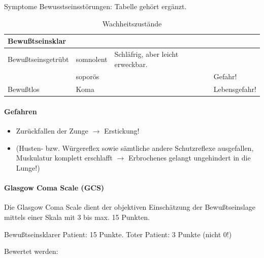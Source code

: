 Symptome Bewusstseinsst\"orungen: Tabelle geh\"ort erg\"anzt.%
%



\begin{table}[H]\begin{center}
\begin{tabulary}{\linewidth}{LLLL}
\toprule
Bewu{\ss}tseinsklar
 &
 &
 &
\\\midrule
Bewu{\ss}tseinsgetr\"ubt
&
somnolent
 &
Schl\"afrig, aber leicht erweckbar.
 &
\\
 &
sopor\"os
 &
 &
Gefahr!
\\\midrule
Bewu{\ss}tlos
 &
Koma
 &
 &
Lebensgefahr!
\\\bottomrule
\end{tabulary}
\caption{Wachheitszustände}
\end{center}\end{table}


\paragraph{Gefahren}

\begin{itemize}
    \item Zur\"uckfallen der Zunge ${\rightarrow}$ Erstickung!
    
    \item {}  (Husten- bzw. W\"urgereflex
    sowie s\"amtliche andere Schutzreflexe ausgefallen,  Muskulatur komplett erschlafft
    ${\rightarrow}$  Erbrochenes gelangt ungehindert in die  Lunge!)
    
\end{itemize}

\paragraph{Glasgow Coma Scale (GCS)}

Die Glasgow Coma Scale dient der objektiven Einsch\"atzung
der Bewu{\ss}tseinslage mittels einer Skala mit 3 bis max.
15 Punkten.

Bewu{\ss}tseinsklarer Patient: 15 Punkte. Toter Patient: 3 Punkte (nicht
0!)

Bewertet werden: 


